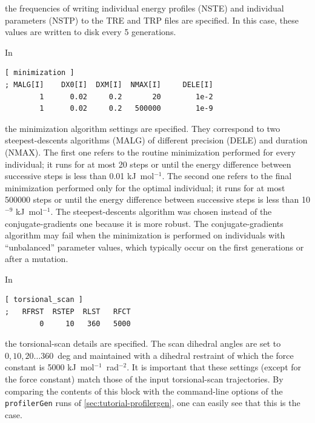 \documentclass[10pt,a4paper,openany]{memoir}
\numberwithin{equation}{section}
\newcommand{\profilergen}[0]{\texttt{profilerGen}}
\begin{document}
\noindent the frequencies of writing individual energy profiles (NSTE)
and individual parameters (NSTP) to the TRE and TRP files are
specified.
%
In this case, these values are written to disk every 5 generations.

In

\begin{lstlisting}[language=gromacs]
[ minimization ]
; MALG[I]    DX0[I]  DXM[I]  NMAX[I]     DELE[I]
        1      0.02     0.2       20        1e-2
        1      0.02     0.2   500000        1e-9

\end{lstlisting}\vspace{1ex}\par

\noindent the minimization algorithm settings are specified.
%
They correspond to two steepest-descents algorithms (MALG) of
different precision (DELE) and duration (NMAX).
%
The first one refers to the routine minimization performed for every
individual; it runs for at most 20 steps or until the energy
difference between successive steps is less than 0.01 kJ~mol$^{-1}$.
%
The second one refers to the final minimization performed only for the
optimal individual; it runs for at most 500000 steps or until the energy
difference between successive steps is less than 10$^{-9}$
kJ~mol$^{-1}$.
%
The steepest-descents algorithm was chosen instead of the
conjugate-gradients one because it is more robust.
%
The conjugate-gradients algorithm may fail when the minimization is
performed on individuals with ``unbalanced'' parameter values, which
typically occur on the first generations or after a mutation.

In

\begin{lstlisting}[language=gromacs]
[ torsional_scan ]
;   RFRST  RSTEP  RLST   RFCT
        0     10   360   5000
\end{lstlisting}\vspace{1ex}\par

\noindent the torsional-scan details are specified.
%
The scan dihedral angles are set to $0,10,20\ldots 360$~deg and
maintained with a dihedral restraint of which the force constant is
5000 kJ~mol$^{-1}$~rad$^{-2}$.
%
It is important that these settings (except for the force constant)
match those of the input torsional-scan trajectories.
%
By comparing the contents of this block with the command-line options
of the \profilergen{} runs of \autoref{sec:tutorial-profilergen}, one
can easily see that this is the case.
\end{document}
